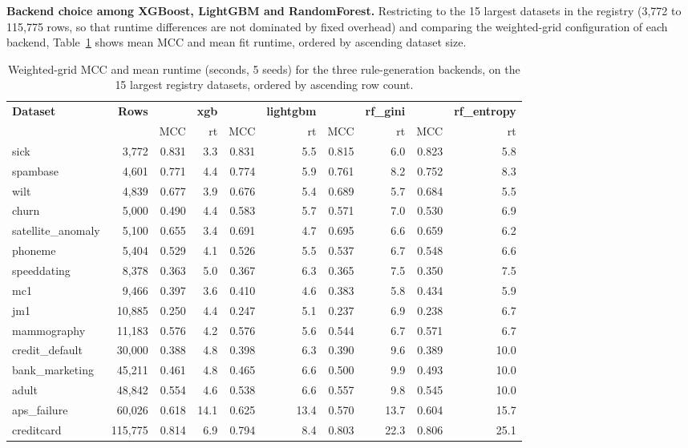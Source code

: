 \documentclass[twoside,11pt]{article}
\begin{document}
\textbf{Backend choice among XGBoost, LightGBM and RandomForest.} Restricting
to the 15 largest datasets in the registry (3{,}772 to 115{,}775 rows, so
that runtime differences are not dominated by fixed overhead) and comparing
the weighted-grid configuration of each backend, Table~\ref{tab:backends}
shows mean MCC and mean fit runtime, ordered by ascending dataset size.

\begin{table}[t]
\centering
\small
\caption{Weighted-grid MCC and mean runtime (seconds, 5 seeds) for the three
rule-generation backends, on the 15 largest registry datasets, ordered by
ascending row count.}
\label{tab:backends}
\begin{tabular}{lrrrrrrrrr}
\hline
\textbf{Dataset} & \textbf{Rows} & & \textbf{xgb} & & \textbf{lightgbm} & & \textbf{rf\_gini} & & \textbf{rf\_entropy} \\
 & & MCC & rt & MCC & rt & MCC & rt & MCC & rt \\
\hline
sick             & 3{,}772   & 0.831 & 3.3  & 0.831 & 5.5  & 0.815 & 6.0  & 0.823 & 5.8  \\
spambase         & 4{,}601   & 0.771 & 4.4  & 0.774 & 5.9  & 0.761 & 8.2  & 0.752 & 8.3  \\
wilt             & 4{,}839   & 0.677 & 3.9  & 0.676 & 5.4  & 0.689 & 5.7  & 0.684 & 5.5  \\
churn            & 5{,}000   & 0.490 & 4.4  & 0.583 & 5.7  & 0.571 & 7.0  & 0.530 & 6.9  \\
satellite\_anomaly & 5{,}100 & 0.655 & 3.4  & 0.691 & 4.7  & 0.695 & 6.6  & 0.659 & 6.2  \\
phoneme          & 5{,}404   & 0.529 & 4.1  & 0.526 & 5.5  & 0.537 & 6.7  & 0.548 & 6.6  \\
speeddating      & 8{,}378   & 0.363 & 5.0  & 0.367 & 6.3  & 0.365 & 7.5  & 0.350 & 7.5  \\
mc1              & 9{,}466   & 0.397 & 3.6  & 0.410 & 4.6  & 0.383 & 5.8  & 0.434 & 5.9  \\
jm1              & 10{,}885  & 0.250 & 4.4  & 0.247 & 5.1  & 0.237 & 6.9  & 0.238 & 6.7  \\
mammography      & 11{,}183  & 0.576 & 4.2  & 0.576 & 5.6  & 0.544 & 6.7  & 0.571 & 6.7  \\
credit\_default   & 30{,}000  & 0.388 & 4.8  & 0.398 & 6.3  & 0.390 & 9.6  & 0.389 & 10.0 \\
bank\_marketing   & 45{,}211  & 0.461 & 4.8  & 0.465 & 6.6  & 0.500 & 9.9  & 0.493 & 10.0 \\
adult            & 48{,}842  & 0.554 & 4.6  & 0.538 & 6.6  & 0.557 & 9.8  & 0.545 & 10.0 \\
aps\_failure      & 60{,}026  & 0.618 & 14.1 & 0.625 & 13.4 & 0.570 & 13.7 & 0.604 & 15.7 \\
creditcard       & 115{,}775 & 0.814 & 6.9  & 0.794 & 8.4  & 0.803 & 22.3 & 0.806 & 25.1 \\
\hline
\end{tabular}
\end{table}
\end{document}
